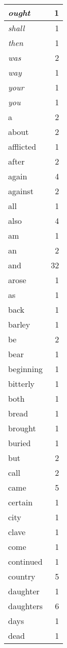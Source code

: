 \begin{center}
\begin{longtable}{l|r}
\emph{ought} & 1 \\ \hline
\emph{shall} & 1 \\ \hline
\emph{then} & 1 \\ \hline
\emph{was} & 2 \\ \hline
\emph{way} & 1 \\ \hline
\emph{your} & 1 \\ \hline
\emph{you} & 1 \\ \hline
a & 2 \\ \hline
about & 2 \\ \hline
afflicted & 1 \\ \hline
after & 2 \\ \hline
again & 4 \\ \hline
against & 2 \\ \hline
all & 1 \\ \hline
also & 4 \\ \hline
am & 1 \\ \hline
an & 2 \\ \hline
and & 32 \\ \hline
arose & 1 \\ \hline
as & 1 \\ \hline
back & 1 \\ \hline
barley & 1 \\ \hline
be & 2 \\ \hline
bear & 1 \\ \hline
beginning & 1 \\ \hline
bitterly & 1 \\ \hline
both & 1 \\ \hline
bread & 1 \\ \hline
brought & 1 \\ \hline
buried & 1 \\ \hline
but & 2 \\ \hline
call & 2 \\ \hline
came & 5 \\ \hline
certain & 1 \\ \hline
city & 1 \\ \hline
clave & 1 \\ \hline
come & 1 \\ \hline
continued & 1 \\ \hline
country & 5 \\ \hline
daughter & 1 \\ \hline
daughters & 6 \\ \hline
days & 1 \\ \hline
dead & 1 \\ \hline

\end{longtable}
\end{center}
